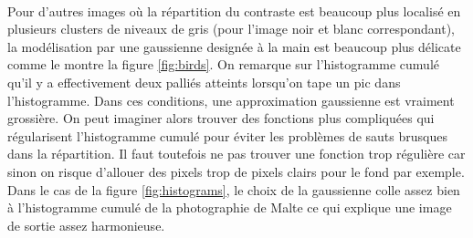 \documentclass{article}
\begin{document}
\paragraph*{}
Pour d'autres images où la répartition du contraste est beaucoup plus localisé en plusieurs clusters de niveaux de gris (pour l'image noir et blanc correspondant), la modélisation par une gaussienne designée à la main est beaucoup plus délicate comme le montre la figure \ref{fig:birds}. On remarque sur l'histogramme cumulé qu'il y a effectivement deux palliés atteints lorsqu'on tape un pic dans l'histogramme. Dans ces conditions, une approximation gaussienne est vraiment grossière. On peut imaginer alors trouver des fonctions plus compliquées qui régularisent l'histogramme cumulé pour éviter les problèmes de sauts brusques dans la répartition. Il faut toutefois ne pas trouver une fonction trop régulière car sinon on risque d'allouer des pixels trop de pixels clairs pour le fond par exemple. Dans le cas de la figure \ref{fig:histograms}, le choix de la gaussienne colle assez bien à l'histogramme cumulé de la photographie de Malte ce qui explique une image de sortie assez harmonieuse.
\end{document}
